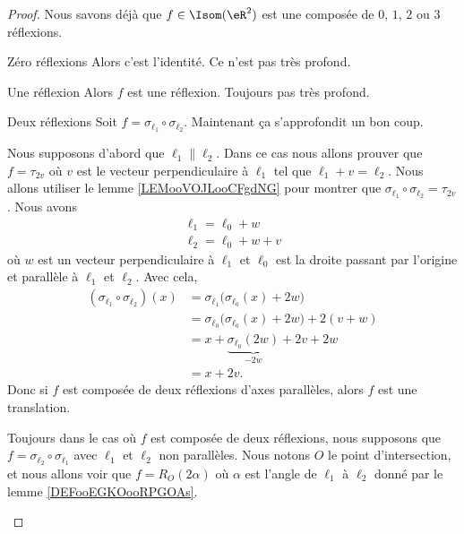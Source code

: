 \begin{proof}
    Nous savons déjà que \( f\in \Isom(\eR^2)\) est une composée de \( 0\), \( 1\), \( 2\) ou \( 3\) réflexions. 
    \begin{subproof}
        \item[Zéro réflexions]
            Alors c'est l'identité. Ce n'est pas très profond.
        \item[Une réflexion]
            Alors \( f\) est une réflexion. Toujours pas très profond.
        \item[Deux réflexions]
            Soit \( f=\sigma_{\ell_1}\circ\sigma_{\ell_2}\). Maintenant ça s'approfondit un bon coup.
            
            Nous supposons d'abord que \( \ell_1\parallel\ell_2\). Dans ce cas nous allons prouver que \( f=\tau_{2v}\) où \( v\) est le vecteur perpendiculaire à \(  \ell_1 \) tel que \( \ell_1+v=\ell_2\). Nous allons utiliser le lemme \ref{LEMooVOJLooCFgdNG} pour montrer que \( \sigma_{\ell_1}\circ\sigma_{\ell_2}=\tau_{2v}\). Nous avons
            \begin{subequations}
                \begin{align}
                    \ell_1=\ell_0+w\\
                    \ell_2=\ell_0+w+v
                \end{align}
            \end{subequations}
            où \( w\) est un vecteur perpendiculaire à \( \ell_1\) et \( \ell_0\) est la droite passant par l'origine et parallèle à \( \ell_1\) et \( \ell_2\). Avec cela,
            \begin{subequations}
                \begin{align}
                    (\sigma_{\ell_1}\circ\sigma_{\ell_2})(x)&=\sigma_{\ell_1}\big( \sigma_{\ell_0}(x)+2w \big)\\
                    &=\sigma_{\ell_0}\big( \sigma_{\ell_0}(x)+2w \big)+2(v+w)\\
                    &=x+\underbrace{\sigma_{\ell_0}(2w)}_{-2w}+2v+2w\\
                    &=x+2v.
                \end{align}
            \end{subequations}
            Donc si \( f\) est composée de deux réflexions d'axes parallèles, alors \( f\) est une translation.

            Toujours dans le cas où \( f\) est composée de deux réflexions, nous supposons que \( f=\sigma_{\ell_2}\circ\sigma_{\ell_1}\) avec \( \ell_1\) et \( \ell_2\) non parallèles. Nous notons \( O\) le point d'intersection, et nous allons voir que \( f=R_O(2\alpha)\) où \( \alpha\) est l'angle de \( \ell_1\) à \( \ell_2\) donné par le lemme \ref{DEFooEGKOooRPGOAs}.


\end{subproof}
\end{proof}

